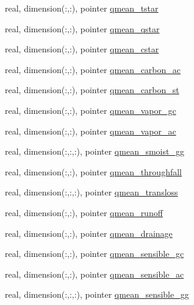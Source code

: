 \begin{DoxyCompactItemize}
real, dimension(\+:,\+:), pointer \hyperlink{structed__state__vars_1_1sitetype_a188913512c72650e6c777ad6b6375264}{qmean\+\_\+tstar}
\item 
real, dimension(\+:,\+:), pointer \hyperlink{structed__state__vars_1_1sitetype_a0c4532650bf05b7843f95b233a27037f}{qmean\+\_\+qstar}
\item 
real, dimension(\+:,\+:), pointer \hyperlink{structed__state__vars_1_1sitetype_a8ce92900ac815cb9947ae01191c384c4}{qmean\+\_\+cstar}
\item 
real, dimension(\+:,\+:), pointer \hyperlink{structed__state__vars_1_1sitetype_ae0385926c1e6620efc4d6d539abab618}{qmean\+\_\+carbon\+\_\+ac}
\item 
real, dimension(\+:,\+:), pointer \hyperlink{structed__state__vars_1_1sitetype_a3f941ab3680ae2c75c300f7bcace3693}{qmean\+\_\+carbon\+\_\+st}
\item 
real, dimension(\+:,\+:), pointer \hyperlink{structed__state__vars_1_1sitetype_a9246fc1f1353b6322f188624d205a68e}{qmean\+\_\+vapor\+\_\+gc}
\item 
real, dimension(\+:,\+:), pointer \hyperlink{structed__state__vars_1_1sitetype_a0caaa95a736ad9c4ffc5cefa814737b9}{qmean\+\_\+vapor\+\_\+ac}
\item 
real, dimension(\+:,\+:,\+:), pointer \hyperlink{structed__state__vars_1_1sitetype_ad5e0e7c7ed954764fa65c192584b88a9}{qmean\+\_\+smoist\+\_\+gg}
\item 
real, dimension(\+:,\+:), pointer \hyperlink{structed__state__vars_1_1sitetype_a942d26aa07028a276ef5d380400e7271}{qmean\+\_\+throughfall}
\item 
real, dimension(\+:,\+:,\+:), pointer \hyperlink{structed__state__vars_1_1sitetype_a2f9f8f375768ad2abc4e861a710220de}{qmean\+\_\+transloss}
\item 
real, dimension(\+:,\+:), pointer \hyperlink{structed__state__vars_1_1sitetype_a8757b859f6ddf3e5a43c58183f8b9abb}{qmean\+\_\+runoff}
\item 
real, dimension(\+:,\+:), pointer \hyperlink{structed__state__vars_1_1sitetype_aa01c3ee7eeb47b5447c5b26ac2addb61}{qmean\+\_\+drainage}
\item 
real, dimension(\+:,\+:), pointer \hyperlink{structed__state__vars_1_1sitetype_ad997e4654e7c70f356dd6a8d0a14e92f}{qmean\+\_\+sensible\+\_\+gc}
\item 
real, dimension(\+:,\+:), pointer \hyperlink{structed__state__vars_1_1sitetype_ac3c705a5a43c3d58865f710965cb49cd}{qmean\+\_\+sensible\+\_\+ac}
\item 
real, dimension(\+:,\+:,\+:), pointer \hyperlink{structed__state__vars_1_1sitetype_aad7fccbd2954d0e125e35556b910e249}{qmean\+\_\+sensible\+\_\+gg}

\end{DoxyCompactItemize}
